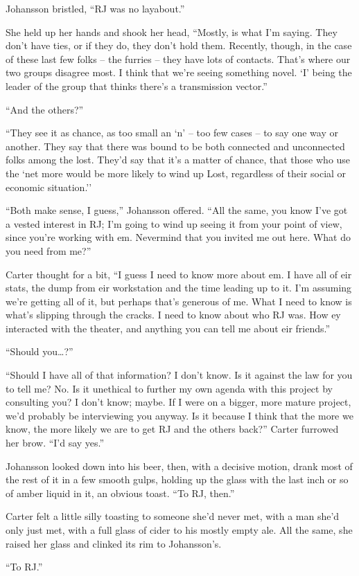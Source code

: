 Johansson bristled, ``RJ was no layabout.''

She held up her hands and shook her head, ``Mostly, is what I'm saying.  They don't have ties, or if they do, they don't hold them.  Recently, though, in the case of these last few folks -- the furries -- they have lots of contacts.  That's where our two groups disagree most.  I think that we're seeing something novel.  `I' being the leader of the group that thinks there's a transmission vector.''

``And the others?''

``They see it as chance, as too small an `n' -- too few cases -- to say one way or another.  They say that there was bound to be both connected and unconnected folks among the lost.  They'd say that it's a matter of chance, that those who use the `net more would be more likely to wind up Lost, regardless of their social or economic situation.''

``Both make sense, I guess,'' Johansson offered.  ``All the same, you know I've got a vested interest in RJ; I'm going to wind up seeing it from your point of view, since you're working with em.  Nevermind that you invited me out here.  What do you need from me?''

Carter thought for a bit, ``I guess I need to know more about em.  I have all of eir stats, the dump from eir workstation and the time leading up to it.  I'm assuming we're getting all of it, but perhaps that's generous of me.  What I need to know is what's slipping through the cracks.  I need to know about who RJ was.  How ey interacted with the theater, and anything you can tell me about eir friends.''

``Should you\ldots{}?''

``Should I have all of that information?  I don't know.  Is it against the law for you to tell me?  No.  Is it unethical to further my own agenda with this project by consulting you?  I don't know; maybe.  If I were on a bigger, more mature project, we'd probably be interviewing you anyway.  Is it because I think that the more we know, the more likely we are to get RJ and the others back?''  Carter furrowed her brow.  ``I'd say yes.''

Johansson looked down into his beer, then, with a decisive motion, drank most of the rest of it in a few smooth gulps, holding up the glass with the last inch or so of amber liquid in it, an obvious toast.  ``To RJ, then.''

Carter felt a little silly toasting to someone she'd never met, with a man she'd only just met, with a full glass of cider to his mostly empty ale.  All the same, she raised her glass and clinked its rim to Johansson's.

``To RJ.''
